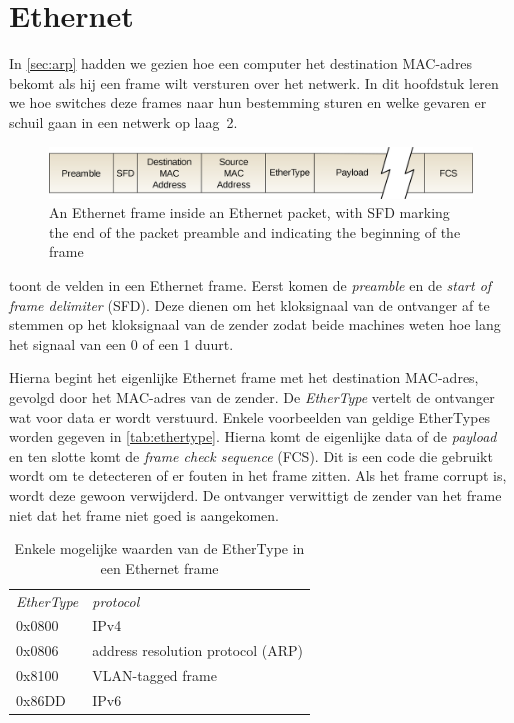 \section{Ethernet}
\label{sec:ethernet}

In \vref{sec:arp} hadden we gezien hoe een computer het destination MAC-adres bekomt als hij een frame wilt versturen over het netwerk.
In dit hoofdstuk leren we hoe switches deze frames naar hun bestemming sturen en welke gevaren er schuil gaan in een netwerk op laag~2.


\begin{figure}[hbp]
    \centering
    \includegraphics[width=\textwidth]{images/Ethernet_frame.png}
    \caption{An Ethernet frame inside an Ethernet packet, with SFD marking the end of the packet preamble and indicating the beginning of the frame}
    \label{fig:ethernet-frame}
\end{figure}


 toont de velden in een Ethernet frame.
Eerst komen de \emph{preamble} en de \emph{start of frame delimiter} (SFD).
Deze dienen om het kloksignaal van de ontvanger af te stemmen op het kloksignaal van de zender zodat beide machines weten hoe lang het signaal van een 0 of een 1 duurt.

Hierna begint het eigenlijke Ethernet frame met het destination MAC-adres, gevolgd door het MAC-adres van de zender.
De \emph{EtherType} vertelt de ontvanger wat voor data er wordt verstuurd.
Enkele voorbeelden van geldige EtherTypes worden gegeven in \vref{tab:ethertype}.
Hierna komt de eigenlijke data of de \emph{payload} en ten slotte komt de \emph{frame check sequence} (FCS).
Dit is een code die gebruikt wordt om te detecteren of er fouten in het frame zitten.
Als het frame corrupt is, wordt deze gewoon verwijderd.
De ontvanger verwittigt de zender van het frame niet dat het frame niet goed is aangekomen.

\begin{table}[htp]
    \centering
    \begin{tabular}{ll}
    \textit{EtherType} & \textit{protocol} \\[1ex]
    0x0800 & IPv4 \\
    0x0806 & address resolution protocol (ARP) \\
    0x8100 & VLAN-tagged frame \\
    0x86DD & IPv6 \\
    \end{tabular}
    \caption{Enkele mogelijke waarden van de EtherType in een Ethernet frame}
    \label{tab:ethertype}
\end{table}


